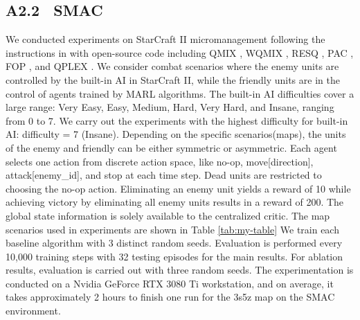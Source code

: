 \subsection{A2.2 \ SMAC}\label{smac}
We conducted experiments on StarCraft II micromanagement following the instructions in \cite{smac} with open-source code including QMIX \cite{QMIX}, WQMIX \cite{WQMIX},  RESQ \cite{ResQ}, PAC \cite{pac}, FOP \cite{fop}, and QPLEX \cite{QPLEX}. We consider combat scenarios where the enemy units are controlled by the built-in AI in StarCraft II, while the friendly units are in the control of agents trained by MARL algorithms. The built-in AI difficulties cover a large range: Very Easy, Easy, Medium, Hard, Very Hard, and Insane, ranging from 0 to 7. We carry out the experiments with the highest difficulty for built-in AI: difficulty = 7 (Insane). Depending on the specific scenarios(maps), the units of the enemy and friendly can be either symmetric or asymmetric.  Each agent selects one action from discrete action space, like no-op, move[direction], attack[enemy\_id], and stop at each time step. Dead units are restricted to choosing the no-op action. Eliminating an enemy unit yields a reward of 10 while achieving victory by eliminating all enemy units results in a reward of 200. The global state information is solely available to the centralized critic. The map scenarios used in experiments are shown in Table \ref{tab:my-table} We train each baseline algorithm with 3 distinct random seeds. Evaluation is performed every 10,000 training steps with 32 testing episodes for the main results.  For ablation results, evaluation is carried out with three random seeds.  The experimentation is conducted on a Nvidia GeForce RTX 3080 Ti workstation, and on average, it takes approximately 2 hours to finish one run for the 3s5z map on the SMAC environment.




